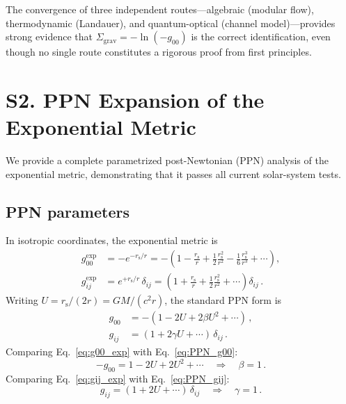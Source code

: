 \documentclass[aps,prd,preprint,superscriptaddress,longbibliography]{revtex4-2}
\newcommand{\rs}{r_{\mathrm{s}}}
\newcommand{\Sgrav}{\Sigma_{\mathrm{grav}}}
\begin{document}
The convergence of three independent routes---algebraic (modular flow),
thermodynamic (Landauer), and quantum-optical (channel
model)---provides strong evidence that $\Sgrav = -\ln(-g_{00})$ is the
correct identification, even though no single route constitutes a
rigorous proof from first principles.

\section{S2. PPN Expansion of the Exponential Metric}
\label{sec:PPN}

We provide a complete parametrized post-Newtonian (PPN) analysis of the
exponential metric, demonstrating that it passes all current
solar-system tests.

\subsection{PPN parameters}

In isotropic coordinates, the exponential metric is
\begin{align}
  g_{00}^{\mathrm{exp}} &= -e^{-\rs/r}
  = -\!\left(1 - \frac{\rs}{r} + \frac{1}{2}\frac{\rs^2}{r^2}
    - \frac{1}{6}\frac{\rs^3}{r^3} + \cdots\right),
  \label{eq:g00_exp}\\
  g_{ij}^{\mathrm{exp}} &= e^{+\rs/r}\,\delta_{ij}
  = \left(1 + \frac{\rs}{r} + \frac{1}{2}\frac{\rs^2}{r^2}
    + \cdots\right)\delta_{ij}\,.
  \label{eq:gij_exp}
\end{align}
Writing $U = \rs/(2r) = GM/(c^2 r)$, the standard PPN form is
\begin{align}
  g_{00} &= -(1 - 2U + 2\beta U^2 + \cdots)\,,
  \label{eq:PPN_g00}\\
  g_{ij} &= (1 + 2\gamma U + \cdots)\,\delta_{ij}\,.
  \label{eq:PPN_gij}
\end{align}
Comparing Eq.~\eqref{eq:g00_exp} with Eq.~\eqref{eq:PPN_g00}:
\begin{equation}
  -g_{00} = 1 - 2U + 2U^2 + \cdots
  \quad\Longrightarrow\quad \beta = 1\,.
  \label{eq:beta}
\end{equation}
Comparing Eq.~\eqref{eq:gij_exp} with Eq.~\eqref{eq:PPN_gij}:
\begin{equation}
  g_{ij} = (1 + 2U + \cdots)\,\delta_{ij}
  \quad\Longrightarrow\quad \gamma = 1\,.
  \label{eq:gamma}
\end{equation}
\end{document}
